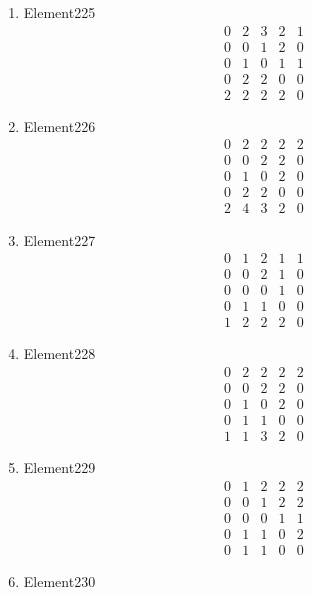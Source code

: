 \documentclass[12pt]{article}
\begin{document}
\begin{multicols}{3}
\begin{enumerate}
\item Element225
\begin{equation*}
\begin{array}{ccccc}
0&2&3&2&1\\
0&0&1&2&0\\
0&1&0&1&1\\
0&2&2&0&0\\
2&2&2&2&0
\end{array}
\end{equation*}
\item Element226
\begin{equation*}
\begin{array}{ccccc}
0&2&2&2&2\\
0&0&2&2&0\\
0&1&0&2&0\\
0&2&2&0&0\\
2&4&3&2&0
\end{array}
\end{equation*}
\item Element227
\begin{equation*}
\begin{array}{ccccc}
0&1&2&1&1\\
0&0&2&1&0\\
0&0&0&1&0\\
0&1&1&0&0\\
1&2&2&2&0
\end{array}
\end{equation*}
\item Element228
\begin{equation*}
\begin{array}{ccccc}
0&2&2&2&2\\
0&0&2&2&0\\
0&1&0&2&0\\
0&1&1&0&0\\
1&1&3&2&0
\end{array}
\end{equation*}
\item Element229
\begin{equation*}
\begin{array}{ccccc}
0&1&2&2&2\\
0&0&1&2&2\\
0&0&0&1&1\\
0&1&1&0&2\\
0&1&1&0&0
\end{array}
\end{equation*}
\item Element230
\begin{equation*}

\end{equation*}
\end{enumerate}
\end{multicols}
\end{document}
